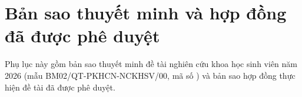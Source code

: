 \chapter{Bản sao thuyết minh và hợp đồng đã được phê duyệt}
\label{pl:f}
Phụ lục này gồm bản sao thuyết minh đề tài nghiên cứu khoa học sinh viên năm 2026 (mẫu BM02/QT-PKHCN-NCKHSV/00, mã số \madetai) và bản sao hợp đồng thực hiện đề tài đã được phê duyệt.
\clearpage

